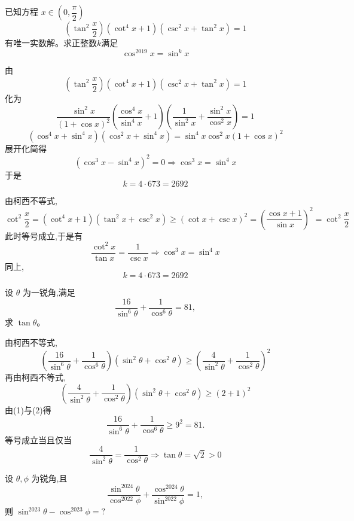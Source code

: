\begin{questions}
    \question 已知方程 $x \in \left(0, \dfrac{\pi}{2}\right)$
    \[
    \left(\tan^2 \frac{x}{2}\right) (\cot^4 x + 1)(\csc^2 x + \tan^2 x) = 1
    \] 
    有唯一实数解。求正整数$k$满足 
    \[
    \cos^{2019} x = \sin^k x
    \]
    \begin{solution}
        由
        \[
        \left(\tan^2 \frac{x}{2}\right) (\cot^4 x + 1)(\csc^2 x + \tan^2 x) = 1
        \]
        化为
        \[
        \frac{\sin^2 x}{(1+\cos x)^2}\left(\frac{\cos^4 x}{\sin^4 x}+1\right)\left(\frac{1}{\sin^2 x}+\frac{\sin^2 x}{\cos^2 x}\right)=1 
        \]
        \[
        (\cos^4 x +\sin^4 x)(\cos^2 x +\sin^4 x)=\sin^4 x \cos^2 x (1+\cos x)^2 
        \]
        展开化简得
        \[
        (\cos^3 x -\sin^4 x)^2=0 \Rightarrow \cos^3 x = \sin^4 x
        \]
        于是
        \[
        k=4 \cdot 673=2692
        \]
    \end{solution}
    \begin{solution}
        由柯西不等式,
        \[
        \cot^2 \frac{x}{2}=(\cot^4 x + 1)( \tan^2 x+\csc^2 x) \ge (\cot x +\csc x)^2 = \left(\frac{\cos x +1}{\sin x}\right)^2=\cot^2 \frac{x}{2}
        \]
        此时等号成立,于是有
        \[
        \frac{\cot^2 x}{\tan x}=\frac{1}{\csc x} \Rightarrow \cos^3 x = \sin^4 x
        \]
        同上,
        \[
        k=4 \cdot 673=2692
        \]
    \end{solution}

    \question 设 $\theta$ 为一锐角,满足
    \[
    \frac{16}{\sin^6 \theta} + \frac{1}{\cos^6 \theta} = 81,
    \]
    求 $\tan \theta$。
    \begin{solution}
        由柯西不等式,
        \[
        \left(\frac{16}{\sin^6 \theta} + \frac{1}{\cos^6 \theta}\right)(\sin^2 \theta + \cos^2 \theta) \ge \left(\frac{4}{\sin^2 \theta} + \frac{1}{\cos^2 \theta}\right)^2 \tag{1}
        \]
        再由柯西不等式,
        \[
        \left(\frac{4}{\sin^2 \theta} + \frac{1}{\cos^2 \theta}\right)(\sin^2 \theta + \cos^2 \theta) \ge (2+1)^2 \tag{2}
        \]
        由(1)与(2)得
        \[
        \frac{16}{\sin^6 \theta} + \frac{1}{\cos^6 \theta} \ge 9^2 = 81.
        \]
        等号成立当且仅当
        \[
        \frac{4}{\sin^2 \theta} = \frac{1}{\cos^2 \theta} \Rightarrow \tan \theta = \sqrt{2}>0 
        \]
    \end{solution}

    \question 设 $\theta,\phi$ 为锐角,且
    \[
    \frac{\sin^{2024}\theta}{\cos^{2022}\phi}+\frac{\cos^{2024}\theta}{\sin^{2022}\phi}=1,
    \]
    则 $\sin^{2023}\theta-\cos^{2023}\phi=?$


\end{questions}
